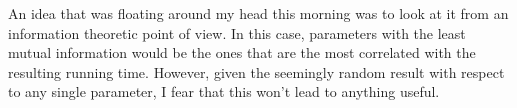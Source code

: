 An idea that was floating around my head this morning was to look
at it from an information theoretic point of view.
In this case, parameters with the least mutual information would be the
ones that are the most correlated with the resulting running time.
However, given the seemingly random result with respect to any
single parameter, I fear that this won't lead to anything useful.

